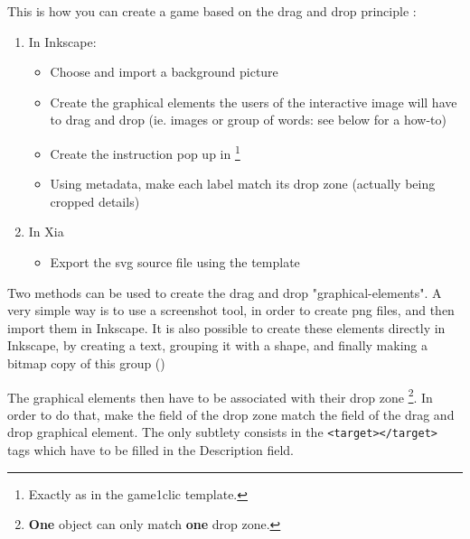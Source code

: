 
This is how you can create a game based on the drag and drop principle :
\begin{enumerate}
 \item In Inkscape:
\begin{itemize}
 \item Choose and import a background picture
 \item Create the graphical elements the users of the interactive image will have to drag and drop (ie. images or group of words: see below for a how-to)
 \item Create the instruction pop up in \footnote{Exactly as in the game1clic template.}
 \item Using metadata, make each label match its drop zone (actually being cropped details)
\end{itemize}
 \item In Xia
 \begin{itemize}
  \item Export the svg source file using the  template
 \end{itemize}
\end{enumerate}

Two methods can be used to create the drag and drop "graphical-elements".
A very simple way is to use a screenshot tool, in order to create png files, and then import them in Inkscape.
It is also possible to create these elements directly in Inkscape, by creating a text, grouping it with a shape,
and finally making a bitmap copy of this group ()


The graphical elements then have to be associated with their drop zone \footnote{\textbf{One} object
can only match \textbf{one} drop zone.}. In order to do that, make the  field of the drop zone match
the  field of the drag and drop graphical element. 
The only subtlety consists in the  \verb|<target></target>| tags which have to be filled in the \softmenu
{Description} field.

